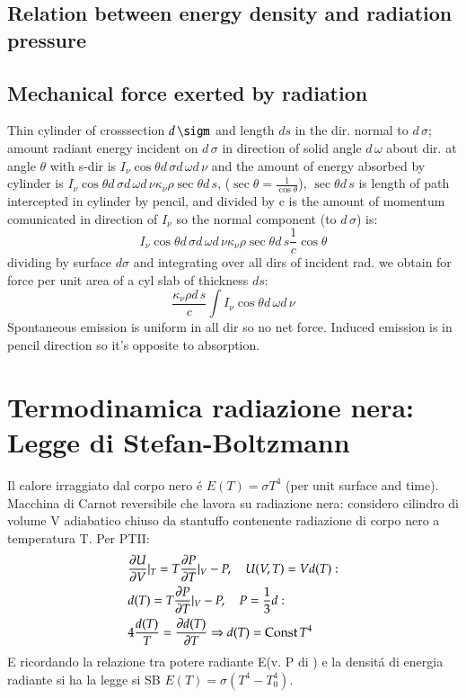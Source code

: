             \subsection{Relation between energy density and radiation pressure}
            \subsection{Mechanical force exerted by radiation}
                Thin cylinder of crosssection $d\,\sigm$ and length $ds$ in the dir. normal to $d\,\sigma$; amount radiant energy incident on $d\,\sigma$ in direction of solid angle $d\,\omega$ about dir. at angle $\theta$ with s-dir is $I_{\nu}\cos{\theta}d\,\sigma d\,\omega d\,\nu$ and the amount of energy absorbed by cylinder is $I_{\nu}\cos{\theta} d\,\sigma d\,\omega d\,\nu\kappa_{\nu}\rho\sec{\theta}d\,s$, ($\sec{\theta}=\frac{1}{\cos{\theta}}$), $\sec{\theta}d\,s$ is length of path intercepted in cylinder by pencil, and divided by c is the amount of momentum comunicated in direction of $I_{\nu}$ so the normal component (to $d\,\sigma$) is: 
                \begin{equation*}
                    I_{\nu}\cos{\theta}d\,\sigma d\,\omega d\,\nu\kappa_{\nu}\rho\sec{\theta}d\,s \frac{1}{c}\cos{\theta}
                \end{equation*}
                dividing by surface $d\sigma$ and integrating over all dirs of incident rad. we obtain for force per unit area of a cyl slab of thickness $ds$:
                \begin{equation*}
                    \frac{\kappa_{\nu}\rho d\,s}{c}\int I_{\nu}\cos{\theta}d\,\omega d\,\nu
                \end{equation*}
                Spontaneous emission is uniform in all dir so no net force. Induced emission is in pencil direction so it's opposite to absorption.
        \section{Termodinamica radiazione nera: Legge di Stefan-Boltzmann}
        Il calore irraggiato dal corpo nero \'e $E(T)=\sigma T^4$ (per unit surface and time).
                Macchina di Carnot reversibile che lavora su radiazione nera: considero cilindro di volume V adiabatico chiuso da stantuffo contenente radiazione di corpo nero a temperatura T. Per PTII:
                \begin{align*}
                    &\PDy{V}{U}|_T=T\PDy{T}{P}|_V-P,\quad U(V,T)=Vd(T):\\
                    &d(T)=T\PDy{T}{P}|_V-P,\quad P=\frac{1}{3}d:\\
                    &4\frac{d(T)}{T}=\PDy{T}{d(T)}\Rightarrow d(T)=\const{}T^4
                \end{align*}
                E ricordando la relazione tra potere radiante E(v. P di \khhff) e la densit\'a di energia radiante si ha la legge si SB $E(T)=\sigma(T^4-T_0^4)$.
